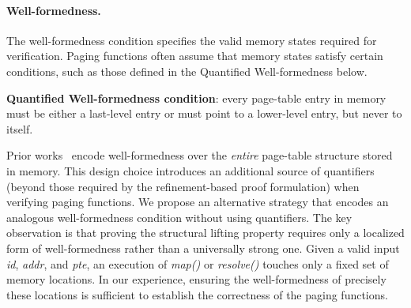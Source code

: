
\paragraph{Well-formedness.} 

The well-formedness condition specifies the valid memory states required for verification. Paging functions often assume that memory states satisfy certain conditions, such as those defined in the Quantified Well-formedness below.

\begin{tcolorbox}[height=1.5cm,valign=center,arc=0pt]
\textbf{Quantified Well-formedness condition}: every page-table entry in memory must be either a last-level entry or must point to a lower-level entry, but never to itself.
\end{tcolorbox}

Prior works~\cite{zhang25cortenmm, atmosphere2025sosp} encode well-formedness over the \emph{entire} page-table structure stored in memory. This design choice introduces an additional source of quantifiers (beyond those required by the refinement-based proof formulation) when verifying paging functions.
We propose an alternative strategy that encodes an analogous well-formedness condition without using quantifiers. 
The key observation is that proving the structural lifting property requires only a localized form of well-formedness rather than a universally strong one. Given a valid input \textit{id}, \textit{addr}, and \textit{pte}, an execution of \textit{map()} or \textit{resolve()} touches only a fixed set of memory locations. In our experience, ensuring the well-formedness of precisely these locations is sufficient to establish the correctness of the paging functions.

